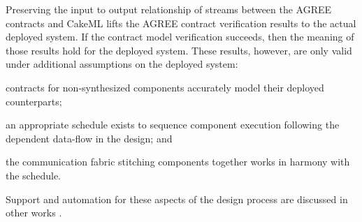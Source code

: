 Preserving the input to output relationship of streams between the
AGREE contracts and CakeML lifts the AGREE contract verification
results to the actual deployed system.  If the contract model
verification succeeds, then the meaning of those results hold for the
deployed system.  These results, however, are only valid under
additional assumptions on the deployed system:
\begin{compactitem}
\item contracts for non-synthesized components accurately model their deployed
counterparts;
\item an appropriate schedule exists to sequence component
  execution following the dependent data-flow in the design; and
\item the communication fabric stitching components together works in harmony
  with the schedule.
\end{compactitem}
\noindent Support and automation for these aspects of the design process are
discussed in other works \cite{gearcase2020, dcrypps2019, 10.1007/978-3-030-89159-6_18, 10.1007/978-3-030-89159-6_17, sel4-2009, scheduled-agree, 9734792}.
